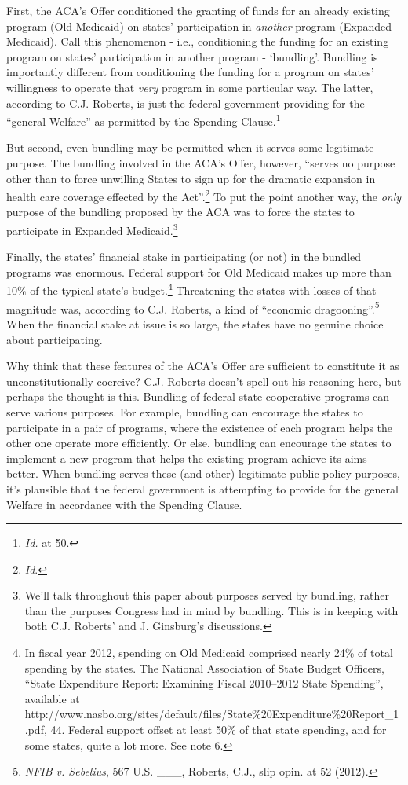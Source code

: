 First, the ACA's Offer conditioned the granting of funds for an already existing program (Old Medicaid) on states' participation in \emph{another} program (Expanded Medicaid). Call this phenomenon - i.e., conditioning the funding for an existing program on states' participation in another program - `bundling'. Bundling is importantly different from conditioning the funding for a program on states' willingness to operate that \emph{very }program in some particular way. The latter, according to C.J. Roberts, is just the federal government providing for the ``general Welfare'' as permitted by the Spending Clause.\footnote{\emph{Id.} at 50.}

But second, even bundling may be permitted when it serves some legitimate purpose. The bundling involved in the ACA's Offer, however, ``serves no purpose other than to force unwilling States to sign up for the dramatic expansion in health care coverage effected by the Act''.\footnote{\emph{Id}.} To put the point another way, the \emph{only} purpose of the bundling proposed by the ACA was to force the states to participate in Expanded Medicaid.\footnote{We'll talk throughout this paper about purposes served by bundling, rather than the purposes Congress had in mind by bundling. This is in keeping with both C.J. Roberts' and J. Ginsburg's discussions.} 

Finally, the states' financial stake in participating (or not) in the bundled programs was enormous. Federal support for Old Medicaid makes up more than 10\% of the typical state's budget.\footnote{In fiscal year 2012, spending on Old Medicaid comprised nearly 24\% of total spending by the states. The National Association of State Budget Officers, ``State Expenditure Report: Examining Fiscal 2010--2012 State Spending'', available at http:/\slash www.nasbo.org\slash sites\slash default\slash files\slash State\%20Expenditure\%20Report\_1.pdf, 44. Federal support offset at least 50\% of that state spending, and for some states, quite a lot more. See note 6.} Threatening the states with losses of that magnitude was, according to C.J. Roberts, a kind of ``economic dragooning''.\footnote{\emph{NFIB v. Sebelius}, 567 U.S. \_\_\_, Roberts, C.J., slip opin. at 52 (2012).} When the financial stake at issue is so large, the states have no genuine choice about participating.

Why think that these features of the ACA's Offer are sufficient to constitute it as unconstitutionally coercive? C.J. Roberts doesn't spell out his reasoning here, but perhaps the thought is this. Bundling of federal-state cooperative programs can serve various purposes. For example, bundling can encourage the states to participate in a pair of programs, where the existence of each program helps the other one operate more efficiently. Or else, bundling can encourage the states to implement a new program that helps the existing program achieve its aims better. When bundling serves these (and other) legitimate public policy purposes, it's plausible that the federal government is attempting to provide for the general Welfare in accordance with the Spending Clause. 


